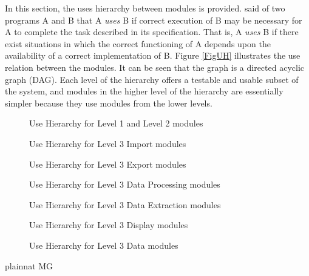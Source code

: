 \documentclass[12pt, titlepage]{article}
\begin{document}
In this section, the uses hierarchy between modules is
provided. \citet{Parnas1978} said of two programs A and B that A {\em uses} B if
correct execution of B may be necessary for A to complete the task described in
its specification. That is, A {\em uses} B if there exist situations in which
the correct functioning of A depends upon the availability of a correct
implementation of B.  Figure \ref{FigUH} illustrates the use relation between
the modules. It can be seen that the graph is a directed acyclic graph
(DAG). Each level of the hierarchy offers a testable and usable subset of the
system, and modules in the higher level of the hierarchy are essentially simpler
because they use modules from the lower levels.

\begin{figure}[h!]
	\centering
	
	\caption{Use Hierarchy for Level 1 and Level 2 modules}
	\label{figure:UH}
\end{figure}

\begin{figure}[h!]
	\centering
	
	\caption{Use Hierarchy for Level 3 Import modules}
	\label{figure:UHIm}
\end{figure}

\begin{figure}[h!]
	\centering
	
	\caption{Use Hierarchy for Level 3 Export modules}
	\label{figure:UHEx}
\end{figure}

\begin{figure}[h!]
	\centering
	
	\caption{Use Hierarchy for Level 3 Data Processing modules}
	\label{figure:UHDP}
\end{figure}

\begin{figure}[h!]
	\centering
	
	\caption{Use Hierarchy for Level 3 Data Extraction modules}
	\label{figure:UHDE}
\end{figure}

\begin{figure}[h!]
	\centering
	
	\caption{Use Hierarchy for Level 3 Display modules}
	\label{figure:UHDisp}
\end{figure}

\begin{figure}[h!]
	\centering
	
	\caption{Use Hierarchy for Level 3 Data modules}
	\label{figure:UHData}
\end{figure}


\clearpage
 {plainnat}
 {MG}
\end{document}
